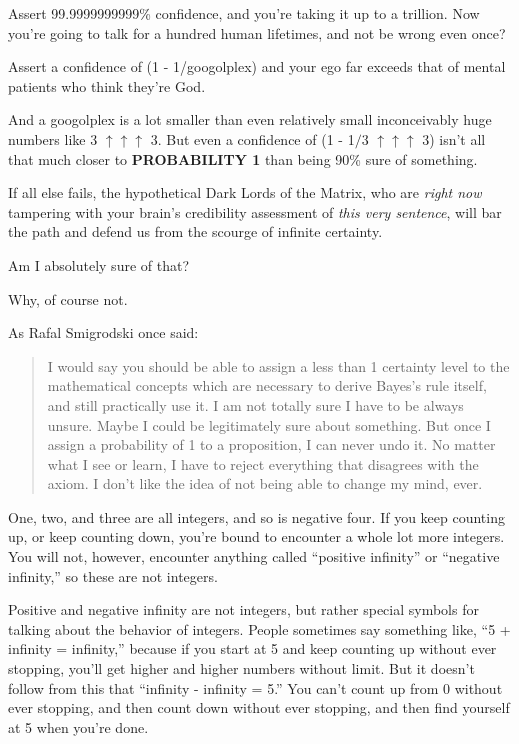 {
 Assert 99.9999999999\% confidence, and you're
taking it up to a trillion. Now you're going to talk
for a hundred human lifetimes, and not be wrong even once?}

{
 Assert a confidence of (1 - 1/googolplex) and your ego far exceeds
that of mental patients who think they're God.}

{
 And a googolplex is a lot smaller than even relatively small
inconceivably huge numbers like 3 $\uparrow \uparrow \uparrow $ 3. But
even a confidence of (1 - 1$/$3 $\uparrow \uparrow \uparrow $ 3)
isn't all that much closer to \textbf{PROBABILITY 1}
than being 90\% sure of something.}

{
 If all else fails, the hypothetical Dark Lords of the Matrix, who
are \textit{right now} tampering with your brain's
credibility assessment of \textit{this very sentence}, will bar the
path and defend us from the scourge of infinite certainty.}

{
 Am I absolutely sure of that?}

{
 Why, of course not.}

{
 As Rafal Smigrodski once said:}

\begin{quote}
{
 I would say you should be able to assign a less than 1 certainty
level to the mathematical concepts which are necessary to derive
Bayes's rule itself, and still practically use it. I am
not totally sure I have to be always unsure. Maybe I could be
legitimately sure about something. But once I assign a probability of 1
to a proposition, I can never undo it. No matter what I see or learn, I
have to reject everything that disagrees with the axiom. I
don't like the idea of not being able to change my
mind, ever.}
\end{quote}

\myendsectiontext


{
 One, two, and three are all integers, and so is negative four. If
you keep counting up, or keep counting down, you're
bound to encounter a whole lot more integers. You will not, however,
encounter anything called ``positive
infinity'' or ``negative
infinity,'' so these are not integers. }

{
 Positive and negative infinity are not integers, but rather
special symbols for talking about the behavior of integers. People
sometimes say something like, ``5 + infinity =
infinity,'' because if you start at 5 and keep
counting up without ever stopping, you'll get higher
and higher numbers without limit. But it doesn't follow
from this that ``infinity - infinity =
5.'' You can't count up from 0
without ever stopping, and then count down without ever stopping, and
then find yourself at 5 when you're done.}

